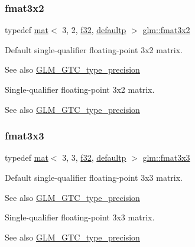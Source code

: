\subsubsection{\texorpdfstring{fmat3x2}{fmat3x2}}
{\footnotesize\ttfamily typedef \hyperlink{structglm_1_1mat}{mat}$<$ 3, 2, \hyperlink{group__gtc__type__precision_ga0ec999b57f5330d9021256e96038df04}{f32}, \hyperlink{namespaceglm_a36ed105b07c7746804d7fdc7cc90ff25a9d21ccd8b5a009ec7eb7677befc3bf51}{defaultp} $>$ \hyperlink{group__gtc__type__precision_gaed9c8fe9d2e094bf3bc7c606bbae1a6b}{glm\+::fmat3x2}}

Default single-\/qualifier floating-\/point 3x2 matrix. \begin{DoxySeeAlso}{See also}
\hyperlink{group__gtc__type__precision}{G\+L\+M\+\_\+\+G\+T\+C\+\_\+type\+\_\+precision}
\end{DoxySeeAlso}
Single-\/qualifier floating-\/point 3x2 matrix. \begin{DoxySeeAlso}{See also}
\hyperlink{group__gtc__type__precision}{G\+L\+M\+\_\+\+G\+T\+C\+\_\+type\+\_\+precision} 
\end{DoxySeeAlso}
\mbox{\label{group__gtc__type__precision_ga5bf6f06e3cac1ed82489f858a0816aaa}} 
\subsubsection{\texorpdfstring{fmat3x3}{fmat3x3}}
{\footnotesize\ttfamily typedef \hyperlink{structglm_1_1mat}{mat}$<$ 3, 3, \hyperlink{group__gtc__type__precision_ga0ec999b57f5330d9021256e96038df04}{f32}, \hyperlink{namespaceglm_a36ed105b07c7746804d7fdc7cc90ff25a9d21ccd8b5a009ec7eb7677befc3bf51}{defaultp} $>$ \hyperlink{group__gtc__type__precision_ga5bf6f06e3cac1ed82489f858a0816aaa}{glm\+::fmat3x3}}

Default single-\/qualifier floating-\/point 3x3 matrix. \begin{DoxySeeAlso}{See also}
\hyperlink{group__gtc__type__precision}{G\+L\+M\+\_\+\+G\+T\+C\+\_\+type\+\_\+precision}
\end{DoxySeeAlso}
Single-\/qualifier floating-\/point 3x3 matrix. \begin{DoxySeeAlso}{See also}
\hyperlink{group__gtc__type__precision}{G\+L\+M\+\_\+\+G\+T\+C\+\_\+type\+\_\+precision} 
\end{DoxySeeAlso}
\mbox{\label{group__gtc__type__precision_gab2daf8468a8b9343c065816df07e29fe}} 

